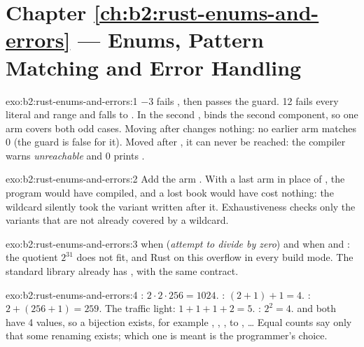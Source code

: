 \section*{Chapter \ref{ch:b2:rust-enums-and-errors} --- Enums, Pattern Matching and Error Handling}

\begin{solution}{exo:b2:rust-enums-and-errors:1}
$-3$ fails , then passes the guard. 12 fails every literal and range and falls to \code{_}. In the second
,  binds the second component, so one arm covers both odd cases. Moving
 after  changes nothing: no earlier arm matches 0 (the guard  is false for it). Moved
after \code{_}, it can never be reached: the compiler warns \emph{unreachable } and 0 prints .
\end{solution}

\begin{solution}{exo:b2:rust-enums-and-errors:2}
Add the arm . With a last arm  in place of , the program
would have compiled, and a lost book would have cost nothing: the wildcard silently took the variant written after
it. Exhaustiveness checks only the variants that are not already covered by a wildcard.
\end{solution}

\begin{solution}{exo:b2:rust-enums-and-errors:3}
  when  (\emph{attempt to divide by zero}) and when  and : the quotient $2^{31}$ does not fit, and Rust  on this overflow in every build mode. The standard library
already has , with the same contract.
\end{solution}

\begin{solution}{exo:b2:rust-enums-and-errors:4}
: $2 \cdot 2 \cdot 256 = 1024$. : $(2 + 1) + 1 = 4$.
: $2 + (256 + 1) = 259$. The traffic light: $1 + 1 + 1 + 2 = 5$. \code{[bool; 2]}:
$2^2 = 4$.  and \code{[bool; 2]} both have 4 values, so a bijection exists, for example
, , ,  to , \dots{}
Equal counts say only that some renaming exists; which one is meant is the programmer's choice.
\end{solution}

